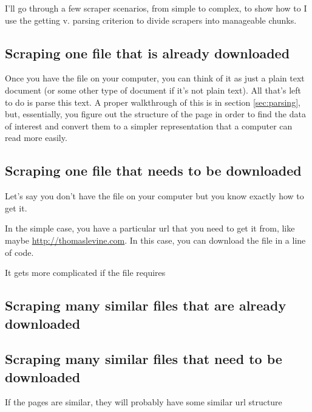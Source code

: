 \documentclass{article}
\begin{document}
I'll go through a few scraper scenarios, from simple to complex, to
show how to I use the getting v. parsing criterion to divide scrapers
into manageable chunks.

\subsection{Scraping one file that is already downloaded}
Once you have the file on your computer, you can think of it as
just a plain text document (or some other type of document if it's
not plain text). All that's left to do is parse this text.
A proper walkthrough of this is in section \ref{sec:parsing},
but, essentially, you figure out the structure of the page in order
to find the data of interest and convert them to a simpler
representation that a computer can read more easily.

\subsection{Scraping one file that needs to be downloaded}
Let's say you don't have the file on your computer but you know
exactly how to get it.

In the simple case, you have a particular url that you need
to get it from, like maybe \url{http://thomaslevine.com}.
In this case, you can download the file in a line of code.

It gets more complicated if the file requires 

\subsection{Scraping many similar files that are already downloaded}

\subsection{Scraping many similar files that need to be downloaded}
If the pages are similar, they will probably have some similar url structure
\end{document}
